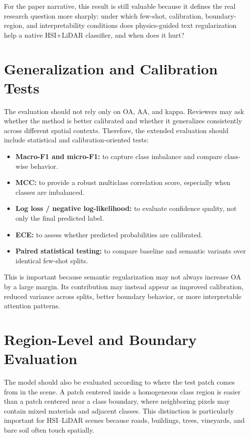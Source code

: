 \documentclass[10pt,journal,compsoc]{IEEEtran}
\begin{document}
For the paper narrative, this result is still valuable because it defines the real research question more sharply: under which few-shot, calibration, boundary-region, and interpretability conditions does physics-guided text regularization help a native HSI+LiDAR classifier, and when does it hurt?

\section{Generalization and Calibration Tests}

The evaluation should not rely only on OA, AA, and kappa. Reviewers may ask whether the method is better calibrated and whether it generalizes consistently across different spatial contexts. Therefore, the extended evaluation should include statistical and calibration-oriented tests:

\begin{itemize}
    \item \textbf{Macro-F1 and micro-F1:} to capture class imbalance and compare class-wise behavior.
    \item \textbf{MCC:} to provide a robust multiclass correlation score, especially when classes are imbalanced.
    \item \textbf{Log loss / negative log-likelihood:} to evaluate confidence quality, not only the final predicted label.
    \item \textbf{ECE:} to assess whether predicted probabilities are calibrated.
    \item \textbf{Paired statistical testing:} to compare baseline and semantic variants over identical few-shot splits.
\end{itemize}

This is important because semantic regularization may not always increase OA by a large margin. Its contribution may instead appear as improved calibration, reduced variance across splits, better boundary behavior, or more interpretable attention patterns.

\section{Region-Level and Boundary Evaluation}

The model should also be evaluated according to where the test patch comes from in the scene. A patch centered inside a homogeneous class region is easier than a patch centered near a class boundary, where neighboring pixels may contain mixed materials and adjacent classes. This distinction is particularly important for HSI--LiDAR scenes because roads, buildings, trees, vineyards, and bare soil often touch spatially.
\end{document}
